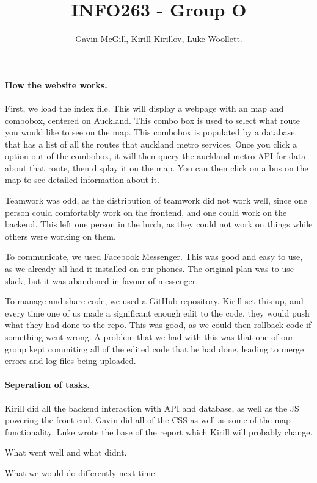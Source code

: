 \documentclass[12pt,a4paper]{report}
\title{INFO263 - Group O}
\author{Gavin McGill, Kirill Kirillov, Luke Woollett.}
\begin{document}
	\maketitle
	
	\paragraph{How the website works. \newline}
	First, we load the index file. This will display a webpage with an map and combobox, centered on Auckland. This combo box is used to select what route you would like to see on the map. This combobox is populated by a database, that has a list of all the routes that auckland metro services. Once you click a option out of the combobox, it will then query the auckland metro API for data about that route, then display it on the map. You can then click on a bus on the map to see detailed information about it. \par
	
	
	Teamwork was odd, as the distribution of teamwork did not work well, since one person could comfortably work on the frontend, and one could work on the backend. This left one person in the lurch, as they could not work on things while others were working on them. 
	
	
	\par To communicate, we used Facebook Messenger. This was good and easy to use, as we already all had it installed on our phones. The original plan was to use slack, but it was abandoned in favour of messenger. 
	
	
	\par To manage and share code, we used a GitHub repository. Kirill set this up, and every time one of us made a significant enough edit to the code, they would push what they had done to the repo. This was good, as we could then rollback code if something went wrong. A problem that we had with this was that one of our group kept commiting all of the edited code that he had done, leading to merge errors and log files being uploaded. 
	
	\paragraph{Seperation of tasks. \newline} 
	Kirill did all the backend interaction with API and database, as well as the JS powering the front end. Gavin did all of the CSS as well as some of the map functionality. Luke wrote the base of the report which Kirill will probably change. 
	
	What went well and what didnt.
	
	
	What we would do differently next time.
	
\end{document}
